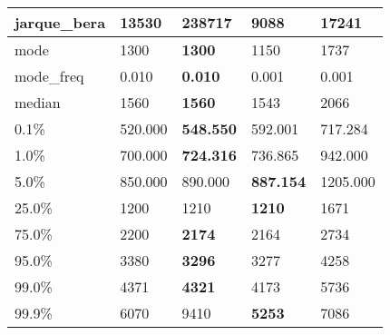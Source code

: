 \begin{table}[H]
\begin{tabular}{|l|m{10em}|m{10em}|m{10em}|m{10em}|}
\hline jarque\_bera & 13530 & \cellcolor[rgb]{0.9, 0.54, 0.52} 238717 & 9088 & \bfseries 17241 \\
\hline mode & 1300 & \bfseries 1300 & 1150 & \cellcolor[rgb]{0.9, 0.54, 0.52} 1737 \\
\hline mode\_freq & 0.010 & \bfseries 0.010 & \cellcolor[rgb]{0.9, 0.54, 0.52} 0.001 & 0.001 \\
\hline median & 1560 & \bfseries 1560 & 1543 & \cellcolor[rgb]{0.9, 0.54, 0.52} 2066 \\
\hline 0.1\% & 520.000 & \bfseries 548.550 & 592.001 & \cellcolor[rgb]{0.9, 0.54, 0.52} 717.284 \\
\hline 1.0\% & 700.000 & \bfseries 724.316 & 736.865 & \cellcolor[rgb]{0.9, 0.54, 0.52} 942.000 \\
\hline 5.0\% & 850.000 & 890.000 & \bfseries 887.154 & \cellcolor[rgb]{0.9, 0.54, 0.52} 1205.000 \\
\hline 25.0\% & 1200 & 1210 & \bfseries 1210 & \cellcolor[rgb]{0.9, 0.54, 0.52} 1671 \\
\hline 75.0\% & 2200 & \bfseries 2174 & 2164 & \cellcolor[rgb]{0.9, 0.54, 0.52} 2734 \\
\hline 95.0\% & 3380 & \bfseries 3296 & 3277 & \cellcolor[rgb]{0.9, 0.54, 0.52} 4258 \\
\hline 99.0\% & 4371 & \bfseries 4321 & 4173 & \cellcolor[rgb]{0.9, 0.54, 0.52} 5736 \\
\hline 99.9\% & 6070 & \cellcolor[rgb]{0.9, 0.54, 0.52} 9410 & \bfseries 5253 & 7086 \\
\hline
\end{tabular}
\end{table}
